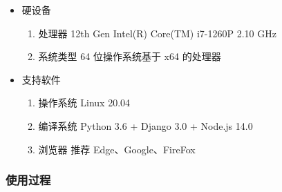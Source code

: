 \documentclass[UTF8,a4paper,10pt]{ctexart}
\begin{document}
\begin{itemize}
    \item 硬设备
    \begin{enumerate}[label=\arabic*.]
        \item 处理器 12th Gen Intel(R) Core(TM) i7-1260P 2.10 GHz
        \item 系统类型 64 位操作系统基于 x64 的处理器
    \end{enumerate}

    \item 支持软件
    \begin{enumerate}[label=\arabic*.]
        \item 操作系统 Linux 20.04
        \item 编译系统 Python 3.6 + Django 3.0 + Node.js 14.0
        \item 浏览器 推荐 Edge、Google、FireFox
    \end{enumerate}

\end{itemize}

\subsubsection{使用过程}
\end{document}
